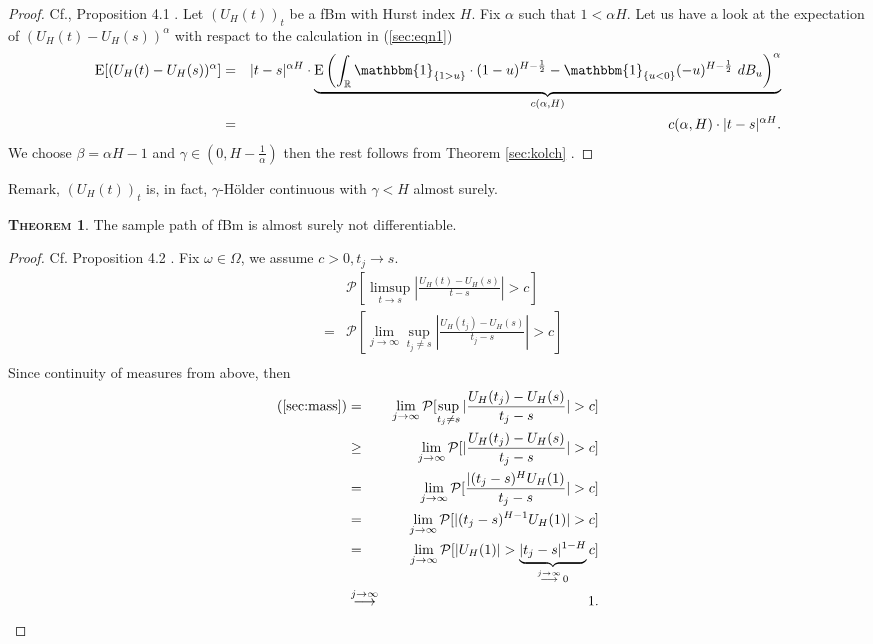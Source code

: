 \documentclass[a4paper, twoside, 11pt]{article}
\theoremstyle{definition}
\newtheorem{theorem}[definition]{\scshape Theorem}
\newcommand{\brkt}[1]{\left({#1} \right)}
\begin{document}
	\begin{proof}
	  Cf.\cite{mandelbrot}, Proposition 4.1 . Let $(U_H(t))_{t}$ be a fBm with Hurst index $H$. Fix $\alpha$ such that $1 < \alpha H$. Let us have a look at the expectation of $(U_H(t) - U_H(s))^\alpha$ with respact to the calculation in (\ref{sec:eqn1})
	  \begin{eqnarray}
		\mathrm{E} [(U_H(t) - U_H(s))^\alpha] &=& |t-s|^{\alpha H} \cdot \underbrace{\mathrm{E}\brkt{\int_{\mathbb{R}} \mathbbm{1}_{\{1 > u\}}\cdot (1-u)^{H-\frac{1}{2}} - \mathbbm{1}_{\{u < 0\}} (-u)^{H-\frac{1}{2}} \, \mathop{dB_u}}^\alpha}_{c(\alpha,H)}\nonumber\\
		&=& c(\alpha,H) \cdot |t-s|^{\alpha H}.
		\label{sec:eqn5}
	  \end{eqnarray}
	  We choose $\beta = \alpha H -1$ and $\gamma \in (0, H-\frac{1}{\alpha})$ then the rest follows from Theorem \ref{sec:kolch} .
	\end{proof}

	Remark, $(U_H(t))_t$ is, in fact, $\gamma$-H\"older continuous with $\gamma < H$ almost surely.

	\begin{theorem}
	  The sample path of fBm is almost surely not differentiable.
	\end{theorem}

	\begin{proof}
	  Cf. \cite{mandelbrot} Proposition 4.2 . Fix $\omega \in \Omega$, we assume $c > 0, t_j \rightarrow s$.
	\begin{eqnarray}
	 && \mathcal{P}[\limsup\limits_{t\rightarrow s} |\frac{U_H(t) - U_H(s)}{t-s}| > c]\nonumber\\
	 &=& \mathcal{P}[\lim\limits_{j\rightarrow\infty}\sup\limits_{t_j\neq s} |\frac{U_H(t_j) - U_H(s)}{t_j-s}| > c]\nonumber\\
	 \label{sec:mass}
	 \end{eqnarray}
	 Since continuity of measures from above, then
	 \begin{eqnarray*}
	 \text{(\ref{sec:mass})} &=& \lim\limits_{j\rightarrow\infty} \mathcal{P}[\sup\limits_{t_j\neq s} |\frac{U_H(t_j) - U_H(s)}{t_j-s}| > c]\\
	 &\ge& \lim\limits_{j\rightarrow\infty} \mathcal{P}[|\frac{U_H(t_j) - U_H(s)}{t_j-s}| > c]\\
	 &=& \lim\limits_{j\rightarrow\infty} \mathcal{P}[\frac{|(t_j-s)^{H}U_H(1)}{t_j - s}| > c]\\
	 &=& \lim\limits_{j\rightarrow\infty} \mathcal{P}[|(t_j-s)^{H-1}U_H(1)| > c]\\
	 &=& \lim\limits_{j\rightarrow\infty} \mathcal{P}[|U_H(1)| > \underbrace{|t_j - s|^{1-H}}_{\overset{j\rightarrow\infty}{\longrightarrow}\, 0}c]\\
	 &\overset{j\rightarrow \infty}{\longrightarrow}& 1 .
	\end{eqnarray*}
	\end{proof}
\end{document}
